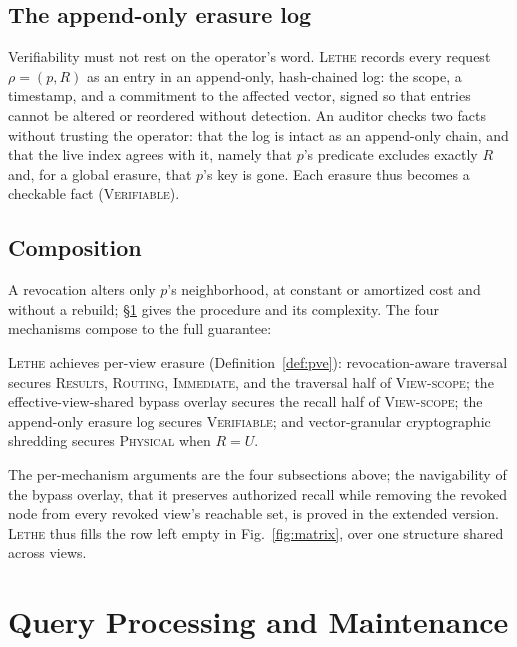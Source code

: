 \documentclass[sigconf, nonacm, review]{acmart}
\begin{document}
\subsection{The append-only erasure log}

Verifiability must not rest on the operator's word. \textsc{Lethe} records every
request $\rho=(p,R)$ as an entry in an append-only, hash-chained log: the
scope, a timestamp, and a commitment to the affected vector, signed so that
entries cannot be altered or reordered without detection. An auditor checks
two facts without trusting the operator: that the log is intact as an
append-only chain, and that the live index agrees with it, namely that
$p$'s predicate excludes exactly $R$ and, for a global erasure, that $p$'s
key is gone. Each erasure thus becomes a checkable fact
(\textsc{Verifiable}).

\subsection{Composition}

A revocation alters only $p$'s neighborhood, at constant or amortized cost
and without a rebuild; \S\ref{sec:query} gives the procedure and its
complexity. The four mechanisms compose to the full guarantee:

\begin{proposition}
\label{prop:lethe}
\textsc{Lethe} achieves per-view erasure (Definition~\ref{def:pve}):
revocation-aware traversal secures \textsc{Results}, \textsc{Routing},
\textsc{Immediate}, and the traversal half of \textsc{View-scope}; the
effective-view-shared bypass overlay secures the recall half of
\textsc{View-scope}; the append-only erasure log secures \textsc{Verifiable};
and vector-granular cryptographic shredding secures \textsc{Physical} when
$R=U$.
\end{proposition}

\noindent The per-mechanism arguments are the four subsections above; the
navigability of the bypass overlay, that it preserves authorized recall while
removing the revoked node from every revoked view's reachable set, is proved
in the extended version. \textsc{Lethe} thus fills the row left empty in
Fig.~\ref{fig:matrix}, over one structure shared across views.

\section{Query Processing and Maintenance}
\label{sec:query}
\end{document}
